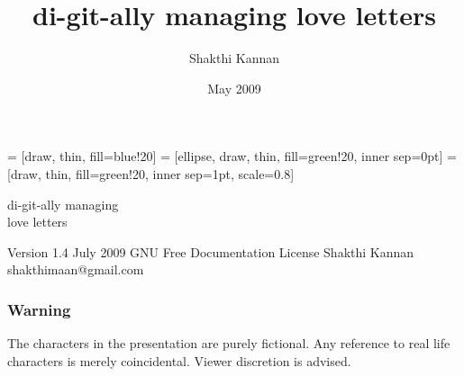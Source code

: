 \documentclass[10pt]{beamer}
\title{di-git-ally managing love letters}
\author{Shakthi Kannan}
\date{May 2009}
\institute{shakthimaan.com}
\newcommand{\medsize}[1]{\fontsize{30}{30}\selectfont #1}
\begin{document}
 = [draw, thin, fill=blue!20]
 = [ellipse, draw, thin, fill=green!20, inner sep=0pt]
 = [draw, thin, fill=green!20, inner sep=1pt, scale=0.8]

%
%

\begin{frame}[fragile]
\begin{block}{}
\begin{center}
\medsize{di-git-ally managing \\love letters}
\end{center}
\end{block}



\begin{semiverbatim}
                               Version 1.4
                                 July 2009
            GNU Free Documentation License
                            Shakthi Kannan
                     shakthimaan@gmail.com
\end{semiverbatim}
\end{frame}

%
%

\begin{frame}[fragile]
\frametitle{Warning}
\begin{center}
\medsize{The characters in the presentation are purely fictional. 
Any reference to real life characters is merely coincidental. 
Viewer discretion is advised.}
\end{center}
\end{frame}

%
%
\end{document}
